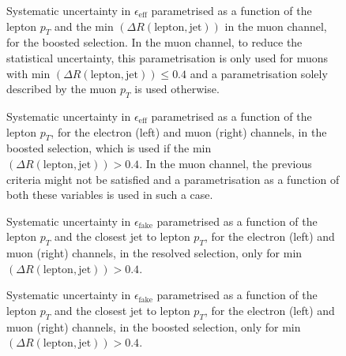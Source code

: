 \begin{figure}
\centering
{}
\caption{Systematic uncertainty in $\epsilon_{\mathrm{eff}}$ parametrised as a function of the lepton $p_T$ and the min $(\Delta R(\textrm{lepton}, \textrm{jet}))$ in the muon channel, for the boosted selection. In the muon channel, to reduce the statistical uncertainty, this parametrisation is only used for muons with min $(\Delta R(\textrm{lepton}, \textrm{jet})) \leq 0.4$ and a parametrisation solely described by the muon $p_T$ is used otherwise.}
\label{fig:ttres8_qcd_eff_boosted_lepPtdR_syst}
\end{figure}

\begin{figure}
\centering
{}
\caption{Systematic uncertainty in $\epsilon_{\mathrm{eff}}$ parametrised as a function of the lepton $p_T$, for the electron (left) and muon (right) channels, in the boosted selection, which is used if the min $(\Delta R(\textrm{lepton}, \textrm{jet})) > 0.4$. In the muon channel, the previous criteria might not be satisfied and a parametrisation as a function of both these variables is used in such a case.}
\label{fig:ttres8_qcd_eff_boosted_lepPt04dR_syst}
\end{figure}

\begin{figure}
\centering
{}
\caption{Systematic uncertainty in $\epsilon_{\mathrm{fake}}$ parametrised as a function of the lepton $p_T$ and the closest jet to lepton $p_T$, for the electron (left) and muon (right) channels, in the resolved selection, only for min $(\Delta R(\textrm{lepton}, \textrm{jet})) > 0.4$.}
\label{fig:ttres8_qcd_fake_resolved_syst}
\end{figure}

\begin{figure}
\centering
{}
\caption{Systematic uncertainty in $\epsilon_{\mathrm{fake}}$ parametrised as a function of the lepton $p_T$ and the closest jet to lepton $p_T$, for the electron (left) and muon (right) channels, in the boosted selection, only for min $(\Delta R(\textrm{lepton}, \textrm{jet})) > 0.4$.}
\label{fig:ttres8_qcd_fake_boosted_syst}
\end{figure}

